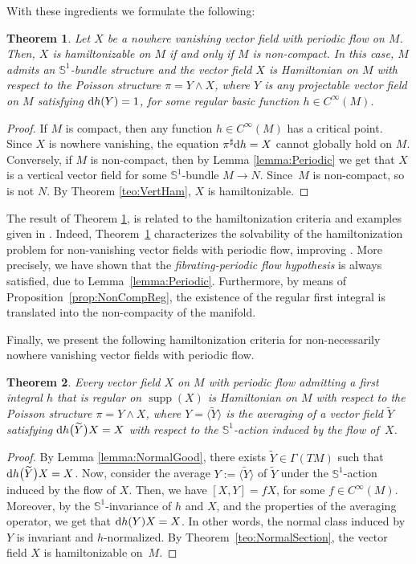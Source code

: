 \documentclass[10pt,a4paper]{amsart}
\newcommand{\dd}{{\rm d}}
\numberwithin{equation}{section}
\newtheorem{Theorem}{Theorem}[section]
\begin{document}
With these ingredients we formulate the following:

\begin{Theorem}\label{teo:Periodic}
Let $X$ be a nowhere vanishing vector field with periodic flow on $M$. Then, $X$ is hamiltonizable on $M$ if and only if $M$ is non-compact. In this case, $M$ admits an $\mathbb{S}^1$-bundle structure and the vector field $X$ is Hamiltonian on $M$ with respect to the Poisson structure $\pi = Y \wedge X$, where $Y$ is any projectable vector field on $M$ satisfying $\dd{h}(Y)=1$, for some regular basic function $h \in C^{\infty}(M)$.
\end{Theorem}
\begin{proof}
If $M$ is compact, then any function $h \in C^{\infty}(M)$ has a critical point. Since $X$ is nowhere vanishing, the equation $\pi^{\sharp}\dd h = X$ cannot globally hold on $M$. Conversely, if $M$ is non-compact, then by Lemma \ref{lemma:Periodic} we get
that $X$ is a vertical vector field for some $\mathbb{S}^1$-bundle $M \to N$. Since~$M$ is non-compact, so is not $N$. By Theorem \ref{teo:VertHam}, $X$ is hamiltonizable.
\end{proof}

The result of Theorem \ref{teo:Periodic}, is related to the hamiltonization criteria and examples given in \cite{FGS-05}. Indeed, Theorem~\ref{teo:Periodic} characterizes the solvability of the hamiltonization problem for non-vanishing vector fields with periodic flow, improving \cite[Theorem~1]{FGS-05}. More precisely, we have shown that the \emph{fibrating-periodic flow hypothesis} is always satisfied, due to Lem\-ma~\ref{lemma:Periodic}. Furthermore, by means of Proposition~\ref{prop:NonCompReg}, the existence of the regular first integral is translated into the non-compacity of the manifold.

Finally, we present the following hamiltonization criteria for non-necessarily nowhere vani\-shing vector fields with periodic flow.

\begin{Theorem}\label{teo:Periodic2}
Every vector field $X$ on $M$ with periodic flow admitting a first integral $h$ that is regular on $\operatorname{supp}(X)$ is Hamiltonian on $M$ with respect to the Poisson structure $\pi = Y \wedge X$, where $Y = \big\langle \widetilde{Y} \big\rangle$ is the averaging of a vector field $\widetilde{Y}$ satisfying $\dd h\big(\widetilde{Y}\big)X = X$ with respect to the $\mathbb{S}^1$-action induced by the flow of~$X$.
\end{Theorem}
\begin{proof}
By Lemma \ref{lemma:NormalGood}, there exists $\widetilde{Y} \in \Gamma(TM)$ such that $\dd h\big(\widetilde{Y}\big)X = X$. Now, consider the average $Y := \big\langle \widetilde{Y} \big\rangle$ of $\widetilde{Y}$ under the $\mathbb{S}^{1}$-action induced by the flow of $X$. Then, we have $[X,Y]=fX$, for some $f \in C^{\infty}(M)$. Moreover, by the $\mathbb{S}^{1}$-invariance of $h$ and $X$, and the properties of the averaging operator, we get that $\dd h(Y)X = X$. In other words, the normal class induced by $Y$ is invariant and $h$-normalized. By Theorem~\ref{teo:NormalSection}, the vector field $X$ is hamiltonizable on~$M$.
\end{proof}
\end{document}
